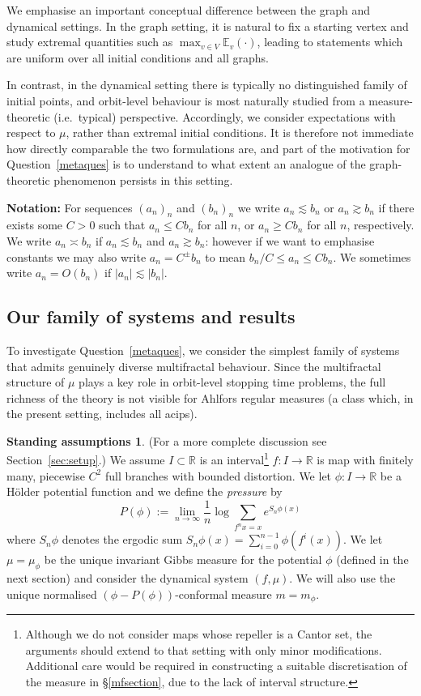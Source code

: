 \documentclass[11pt, reqno]{amsart}
\numberwithin{equation}{section}
\theoremstyle{plain}%
\theoremstyle{definition}
\def\R{\ensuremath{\mathbb R}}
\theoremstyle{nonumberplain}
\newtheorem*{assumptions}{Standing assumptions}
\begin{document}
We emphasise an important conceptual difference between the graph and dynamical settings. In the graph setting, it is natural to fix a starting vertex and study extremal quantities such as $\max_{v \in V} \mathbb{E}_v(\cdot)$, leading to statements which are uniform over all initial conditions and all graphs. 

In contrast, in the dynamical setting there is typically no distinguished family of initial points, and orbit-level behaviour is most naturally studied from a measure-theoretic (i.e.\ typical) perspective. Accordingly, we consider expectations with respect to $\mu$, rather than extremal initial conditions. It is therefore not immediate how directly comparable the two formulations are, and part of the motivation for Question~\ref{metaques} is to understand to what extent an analogue of the graph-theoretic phenomenon persists in this setting.

\textbf{Notation:} For sequences $(a_n)_n$ and $(b_n)_n$ we write $a_n\lesssim b_n$ or $a_n\gtrsim b_n$ if there exists some $C>0$ such that $a_n\le Cb_n$ for all $n$, or $a_n\ge Cb_n$ for all $n$, respectively.  We write $a_n\asymp b_n$ if $a_n\lesssim b_n$ and $a_n\gtrsim b_n$: however if we want to emphasise constants we may also write $a_n= C^\pm b_n$ to mean $b_n/C\le a_n\le Cb_n$.  We sometimes write $a_n= O(b_n)$ if $|a_n|\lesssim |b_n|$.

\subsection{Our family of systems and results}\label{maps}

To investigate Question~\ref{metaques}, we consider the simplest family of systems that admits genuinely diverse multifractal behaviour. Since the multifractal structure of $\mu$ plays a key role in orbit-level stopping time problems, the full richness of the theory is not visible for Ahlfors regular measures (a class which, in the present setting, includes all acips).

\begin{assumptions} (For a more complete discussion see Section~\ref{sec:setup}.) We assume $I \subset \R$ is an interval\footnote{Although we do not consider maps whose repeller is a Cantor set, the arguments should extend to that setting with only minor modifications. Additional care would be required in constructing a suitable discretisation of the measure in \S\ref{mfsection}, due to the lack of interval structure.}  $f:I \to \R$ is map with finitely many, piecewise $C^2$ full branches with bounded distortion. We let $\phi:I \to \R$ be a H\"older potential function and we define the \emph{pressure} by 
$$P(\phi):=\lim_{n \to \infty} \frac{1}{n} \log \sum_{f^nx=x} e^{S_n\phi(x)}$$
where $S_n \phi$ denotes the ergodic sum $S_n\phi(x)=\sum_{i=0}^{n-1}\phi(f^i(x))$. We let $\mu=\mu_\phi$ be the unique invariant Gibbs measure for the potential $\phi$ (defined in the next section) and consider the dynamical system $(f,\mu)$.  We will also use the unique normalised $(\phi-P(\phi))$-conformal measure $m= m_\phi$.
\end{assumptions}
\end{document}
